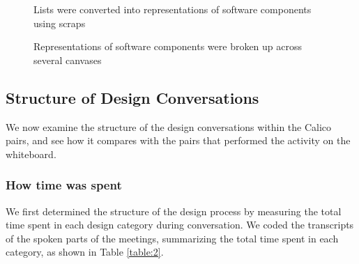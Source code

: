 \begin{figure}%
  \centering
   \caption {Lists were converted into representations of software components using scraps}
   \label{fig:11}
\end{figure}%

\begin{figure}%
  \centering
   \caption {Representations of software components were broken up across several canvases}
   \label{fig:12}
\end{figure}%

\subsection {Structure of Design Conversations}
\label{results:3}

We now examine the structure of the design conversations within the Calico pairs, and see how it compares with the pairs that performed the activity on the whiteboard. 

\subsubsection {How time was spent}
\label{results:31}

We first determined the structure of the design process by measuring the total time spent in each design category during conversation. We coded the transcripts of the spoken parts of the meetings, summarizing the total time spent in each category, as shown in Table \ref{table:2}. 

